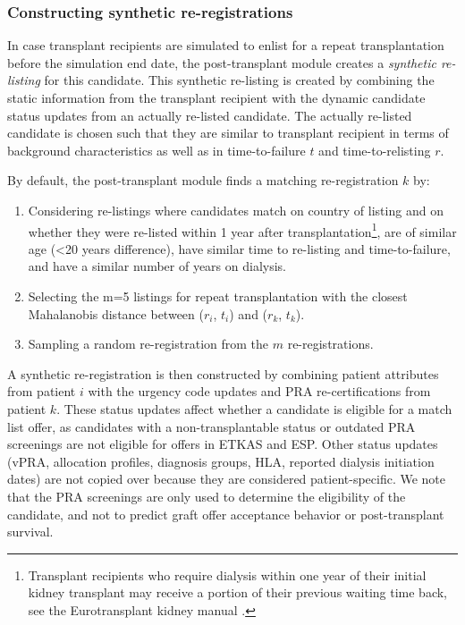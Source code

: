 \documentclass[11pt,twoside,]{book}
\let\rmarkdownfootnote\footnote%
\def\footnote{\protect\rmarkdownfootnote}
\begin{document}
\subsubsection{Constructing synthetic re-registrations}\label{sec:etkidneysynthreg}

In case transplant recipients are simulated to enlist for a repeat
transplantation before the simulation end date, the post-transplant
module creates a \emph{synthetic re-listing} for this candidate. This
synthetic re-listing is created by combining the static information from
the transplant recipient with the dynamic candidate status updates from
an actually re-listed candidate. The actually re-listed candidate is
chosen such that they are similar to transplant recipient in terms of
background characteristics as well as in time-to-failure \(t\) and time-to-relisting
\(r\).

By default, the post-transplant module finds a matching re-registration
\(k\) by:

\begin{enumerate}
\def\labelenumi{\arabic{enumi}.}
\item
  Considering re-listings where candidates match on country of listing and on
  whether they were re-listed within 1 year after transplantation\footnote{Transplant
    recipients who require dialysis within one year of their initial kidney
    transplant may receive a portion of their previous waiting time back, see
    the Eurotransplant kidney manual \citep{manualKidney}.}, are of similar age (\textless20 years difference), have similar time
  to re-listing and time-to-failure, and have a similar number
  of years on dialysis.
\item
  Selecting the m=5 listings for repeat transplantation with the closest Mahalanobis
  distance between (\(r_i\), \(t_i\)) and (\(r_k\), \(t_k\)).
\item
  Sampling a random re-registration from the \(m\) re-registrations.
\end{enumerate}

A synthetic re-registration is then constructed by combining patient
attributes from patient \(i\) with the urgency code updates and PRA re-certifications
from patient \(k\). These status updates affect whether a candidate is eligible for a match
list offer, as candidates with a non-transplantable status or outdated PRA screenings
are not eligible for offers in ETKAS and ESP. Other status updates (vPRA, allocation profiles,
diagnosis groups, HLA, reported dialysis initiation dates) are not copied over
because they are considered patient-specific. We note that the PRA screenings
are only used to determine the eligibility of the candidate, and not to predict
graft offer acceptance behavior or post-transplant survival.
\end{document}
